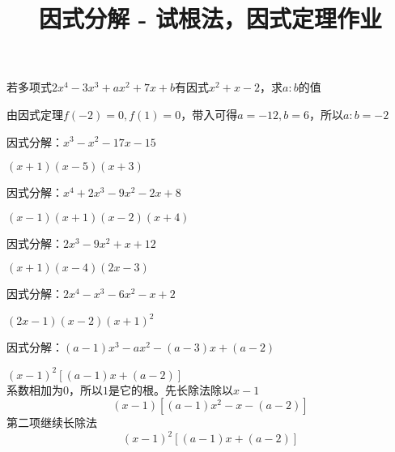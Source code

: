 \documentclass[windows,csize4,answers]{BHCexam}
\title{因式分解 - 试根法，因式定理作业}
\begin{document}
\maketitle


\begin{groups}
    \begin{questions}[]

        \question[5] 若多项式$2x^4-3x^3+ax^2+7x+b$有因式$x^2+x-2$，求$a:b$的值
        \begin{solution}{0.5cm}
            \methodonly 由因式定理$f(-2)=0,f(1)=0$，带入可得$a=-12,b=6$，所以$a:b=-2$
        \end{solution}
        \vspace{3.5cm}

        \question[5] 因式分解：$x^3-x^2-17x-15$
        \begin{solution}{0.5cm}
            \methodonly $(x+1)(x-5)(x+3)$
        \end{solution}
        \vspace{3.5cm}

        \question[5] 因式分解：$x^4+2x^3-9x^2-2x+8$
        \begin{solution}{0.5cm}
            \methodonly $(x-1)(x+1)(x-2)(x+4)$
        \end{solution}
        \vspace{3.5cm}

        \question[5] 因式分解：$2x^3-9x^2+x+12$
        \begin{solution}{0.5cm}
            \methodonly $(x+1)(x-4)(2x-3)$
        \end{solution}
        \vspace{3.5cm}

        \question[5] 因式分解：$2x^4-x^3-6x^2-x+2$
        \begin{solution}{0.5cm}
            \methodonly $(2x-1)(x-2)(x+1)^2$
        \end{solution}
        \vspace{3.5cm}

        \question[5] 因式分解：$(a-1)x^3-ax^2-(a-3)x+(a-2)$
        \begin{solution}{0.5cm}
            \methodonly $(x-1)^2[(a-1)x+(a-2)]$ \\ 
            系数相加为$0$，所以$1$是它的根。先长除法除以$x-1$
            \[
                (x-1)[(a-1)x^2-x-(a-2)]
            \]
            第二项继续长除法 
            \[
                (x-1)^2[(a-1)x+(a-2)]
            \]
        \end{solution}
        \vspace{3.5cm}





\end{questions}
\end{groups}
\end{document}
